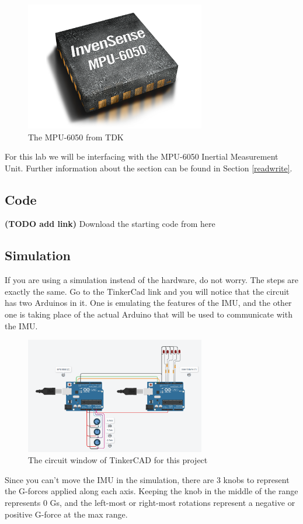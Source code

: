 \documentclass{article}
\begin{document}
        \begin{figure}[ht]
            \centering
            \includegraphics[width = 0.7\textwidth]{img/rp-mpu-6050.png}
            \caption{The MPU-6050 from TDK}
        \end{figure}
        For this lab we will be interfacing with the MPU-6050 Inertial Measurement Unit. Further information about the section can be found in Section \ref{readwrite}.
        
    \subsection{Code}
         \textbf{(TODO add link)} Download the starting code from here
        
    \subsection{Simulation}
        If you are using a simulation instead of the hardware, do not worry.  The steps are exactly the same.  Go to the TinkerCad link and you will notice that the circuit has two Arduinos in it.  One is emulating the features of the IMU, and the other one is taking place of the actual Arduino that will be used to communicate with the IMU.
        
        \begin{figure}[ht]
            \centering
            \includegraphics[width = 0.7\textwidth]{img/TinkerCadWires.PNG}
            \caption{The circuit window of TinkerCAD for this project}
        \end{figure}
        Since you can't move the IMU in the simulation, there are 3 knobs to represent the G-forces applied along each axis. Keeping the knob in the middle of the range represents 0 Gs, and the left-most or right-most rotations represent a negative or positive G-force at the max range. 
        
\end{document}
